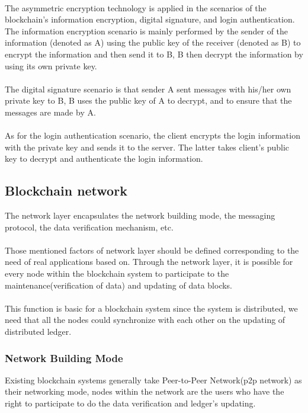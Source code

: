 \documentclass[]{article}
\begin{document}
\begin{CJK*}{UTF8}{gbsn}
\paragraph{} The asymmetric encryption technology is applied in the scenarios of the blockchain's information encryption, digital signature, and login authentication. The information encryption scenario is mainly performed by the sender of the information (denoted as A) using the public key of the receiver (denoted as B) to encrypt the information and then send it to B, B  then decrypt the information by using its own private key. 
\paragraph{} The digital signature scenario is that sender A sent messages with his/her own private key to B, B uses the public key of A to decrypt, and to ensure that the messages are made by A. 
\paragraph{} As for the login authentication scenario, the client encrypts the login information with the private key and sends it to the server. The latter takes client's public key to decrypt and authenticate the login information.
\subsection{Blockchain network}	
The network layer encapsulates the network building mode, the messaging protocol, the data verification mechanism, etc. 
\paragraph{} Those mentioned factors of network layer should be defined corresponding to the need of real applications based on. Through the network layer, it is possible for every node within the blockchain system to participate to the maintenance(verification of data) and updating of data blocks. 
\paragraph{} This function is basic for a blockchain system since the system is distributed, we need that all the nodes could synchronize with each other on the updating of distributed ledger.
\subsubsection*{Network Building Mode}
Existing blockchain systems generally take Peer-to-Peer Network(p2p network) as their networking mode, nodes within the network are the users who have the right to participate to do the data verification and ledger's updating.

\end{CJK*}
\end{document}
